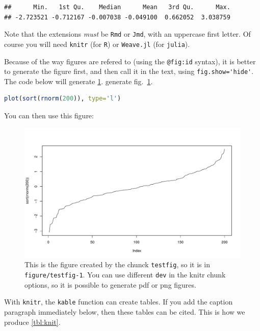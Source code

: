 \documentclass[12pt]{article}
\begin{document}
\begin{lstlisting}
##      Min.   1st Qu.    Median      Mean   3rd Qu.      Max.
## -2.723521 -0.712167 -0.007038 -0.049100  0.662052  3.038759
\end{lstlisting}

Note that the extensions \emph{must} be \lstinline!Rmd! or
\lstinline!Jmd!, with an uppercase first letter. Of course you will need
\lstinline!knitr! (for \lstinline!R!) or \lstinline!Weave.jl! (for
\lstinline!julia!).

Because of the way figures are refered to (using the \lstinline!@fig:id!
syntax), it is better to generate the figure first, and then call it in
the text, using \lstinline!fig.show='hide'!. The code below will
generate \cref{fig:chunk}.
generate fig.~\ref{fig:chunk}.

\begin{lstlisting}[language=R]
plot(sort(rnorm(200)), type='l')
\end{lstlisting}

You can then use this figure:

\begin{figure}[htbp]
\centering
\includegraphics[width=1.00000\textwidth]{figure/testfig-1.pdf}
\caption{This is the figure created by the chunck \lstinline!testfig!,
so it is in \lstinline!figure/testfig-1!. You can use different
\lstinline!dev! in the knitr chunk options, so it is possible to
generate pdf or png figures.\label{fig:chunk}}
\end{figure}

With \lstinline!knitr!, the \lstinline!kable! function can create
tables. If you add the caption paragraph immediately below, then these
tables can be cited. This is how we produce
\cref{tbl:knit}.
\end{document}
